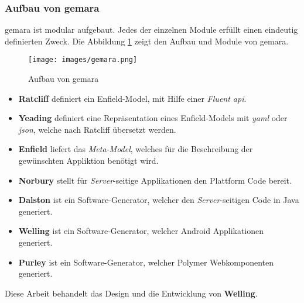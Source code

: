 \newpage

\subsubsection{Aufbau von \acs{gemara}}

\acs{gemara} ist modular aufgebaut. Jedes der einzelnen Module erfüllt einen eindeutig definierten Zweck. Die Abbildung \ref{fig:gemara} zeigt den Aufbau und Module von \acs{gemara}.

\begin{figure}[H]
	\begin{center}
		\texttt{[image: images/gemara.png]}
		\caption{Aufbau von \acs{gemara}}
		\label{fig:gemara}
	\end{center}
\end{figure}

\begin{itemize}
	\item \textbf{Ratcliff} definiert ein Enfield-Model, mit Hilfe einer \textit{Fluent \acs{api}}.
	\item \textbf{Yeading} definiert eine Repräsentation eines Enfield-Models mit \textit{\acf{yaml}} oder \textit{\acf{json}}, welche nach Ratcliff übersetzt werden.
	\item \textbf{Enfield} liefert das \textit{Meta-Model}, welches für die Beschreibung der gewünschten Appliktion benötigt wird.
	\item \textbf{Norbury} stellt für \textit{Server}-seitige Applikationen den Plattform Code bereit.
	\item \textbf{Dalston} ist ein Software-Generator, welcher den \textit{Server}-seitigen Code in Java generiert.
	\item \textbf{Welling} ist ein Software-Generator, welcher Android Applikationen generiert.
	\item \textbf{Purley} ist ein Software-Generator, welcher Polymer Webkomponenten generiert. 
\end{itemize}


Diese Arbeit behandelt das Design und die Entwicklung von \textbf{Welling}.